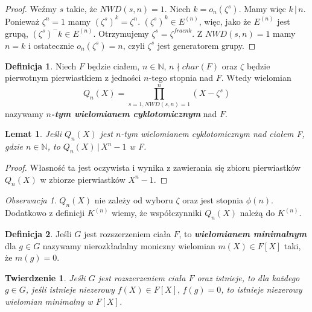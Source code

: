 \documentclass[polish,declaration,shortabstract]{iithesis}
\theoremstyle{definition}
\newtheorem{definition}{Definicja}
\theoremstyle{remark} \newtheorem{observation}{Obserwacja}
\theoremstyle{plain} \newtheorem{theorem}{Twierdzenie}
\theoremstyle{plain} \newtheorem{lemma}{Lemat}
\theoremstyle{remark} \newtheorem*{remark*}{Uwaga}
\theoremstyle{reminder} \newtheorem*{reminder*}{Przypomnienie}
\begin{document}
\begin{proof}
	Weźmy $s$ takie, że $NWD(s, n) = 1$. Niech $k = o_n(\zeta^s)$. Mamy więc $k \, | \, n$. Ponieważ $\zeta^n = 1$ mamy $(\zeta^s)^k = \zeta^n$. $(\zeta^s)^k \in E^{(n)}$, więc, jako że $E^{(n)}$ jest grupą, $(\zeta^s)^-k \in E^{(n)}$. Otrzymujemy $\zeta^s = \zeta^{frac{n}{k}}$. Z $NWD(s, n) = 1$ mamy $n = k$ i ostatecznie $o_n(\zeta^s) = n$, czyli $\zeta^s$ jest generatorem grupy. 
\end{proof}
	
\begin{definition}
	Niech $F$ będzie ciałem, $n \in \mathbb{N}, \, n \nmid char(F)$ oraz $\zeta$ będzie pierwotnym pierwiastkiem z jedności $n$-tego stopnia nad $F$. Wtedy wielomian \[Q_n(X) = \prod_{s = 1, NWD(s, n) = 1}^{n}(X - \zeta^s)\] nazywamy \textit{\textbf{$n$-tym wielomianem cyklotomicznym}} nad $F$.
\end{definition}
	
\begin{lemma}\label{cyklo_dzieli}
	Jeśli $Q_n(X)$ jest $n$-tym wielomianem cyklotomicznym nad ciałem F, gdzie $n\in \mathbb{N}$, to $Q_n(X) \, | \, X^n - 1$ w F.
\end{lemma}
	
\begin{proof} 
	Własność ta jest oczywista i wynika z zawierania się zbioru pierwiastków $Q_n(X)$ w zbiorze pierwiastków $X^n - 1$.
\end{proof}
	
\begin{observation}
	$Q_n(X)$ nie zależy od wyboru $\zeta$ oraz jest stopnia $\phi(n)$. Dodatkowo z definicji $K^{(n)}$ wiemy, że współczynniki $Q_n(X)$ należą do $K^{(n)}$.
\end{observation}
    

\begin{definition}
	Jeśli $G$ jest rozszerzeniem ciała $F$, to \textbf{\textit{wielomianem minimalnym}} dla $g \in G$ nazywamy nierozkładalny moniczny wielomian $m(X) \in F[X]$ taki, że $m(g) = 0$.
\end{definition}
	
\begin{theorem}
	Jeśli $G$ jest rozszerzeniem ciała $F$ oraz istnieje, to dla każdego $g \in G$, jeśli istnieje niezerowy $f(X) \in F[X], \, f(g) = 0$, to istnieje niezerowy wielomian minimalny w $F[X]$.
\end{theorem}
	
\end{document}
